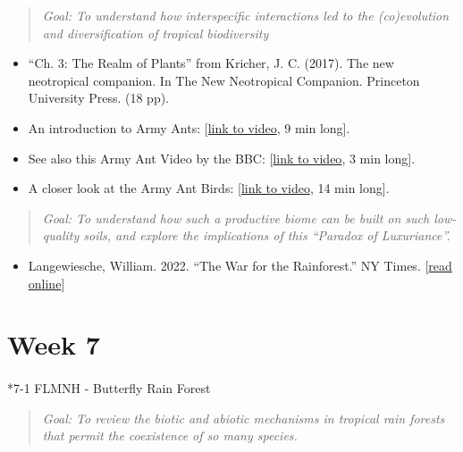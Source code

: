 \documentclass[
  10pt,
  letterpaper,
  oneside,
  open=any]{scrbook}
\makeatletter
\let\oldparagraph\paragraph
\renewcommand{\paragraph}{
    \@ifstar
      \xxxParagraphStar
      \xxxParagraphNoStar
  }
\newcommand{\xxxParagraphStar}[1]{\oldparagraph*{#1}\mbox{}}
\newcommand{\xxxParagraphNoStar}[1]{\oldparagraph{#1}\mbox{}}
\providecommand{\tightlist}{%
  \setlength{\itemsep}{0pt}\setlength{\parskip}{0pt}}
\makeatother
\begin{document}
\begin{quote}
\emph{Goal: To understand how interspecific interactions led to the
(co)evolution and diversification of tropical biodiversity}
\end{quote}

\begin{itemize}
\item
  ``Ch. 3: The Realm of Plants'' from Kricher, J. C. (2017). The new
  neotropical companion. In The New Neotropical Companion. Princeton
  University Press. (18 pp).
\item
  An introduction to Army Ants:
  {[}\href{https://www.youtube.com/watch?v=p16g5IVCdeE}{link to video},
  9 min long{]}.
\item
  See also this Army Ant Video by the BBC:
  {[}\href{https://www.youtube.com/watch?v=JsfiUR0ZzLw}{link to video},
  3 min long{]}.
\item
  A closer look at the Army Ant Birds:
  {[}\href{https://www.youtube.com/watch?v=SQPcIYV_vKM}{link to video},
  14 min long{]}.
\end{itemize}

\begin{quote}
\emph{Goal: To understand how such a productive biome can be built on
such low-quality soils, and explore the implications of this ``Paradox
of Luxuriance''.}
\end{quote}

\begin{itemize}
\tightlist
\item
  Langewiesche, William. 2022. ``The War for the Rainforest.'' NY Times.
  {[}\href{https://www.nytimes.com/2022/03/16/magazine/amazon-rainforest-ituna-itata.html}{read
  online}{]}
\end{itemize}

\section*{Week 7}\label{week-7}


\paragraph*{7-1 FLMNH - Butterfly Rain
Forest}\label{flmnh---butterfly-rain-forest}

\begin{quote}
\emph{Goal: To review the biotic and abiotic mechanisms in tropical rain
forests that permit the coexistence of so many species.}
\end{quote}
\end{document}

